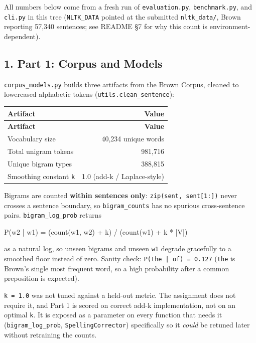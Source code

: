 \documentclass[11pt,a4paper]{article}
\begin{document}
All numbers below come from a fresh run of \texttt{evaluation.\allowbreak{}py}, \texttt{benchmark.\allowbreak{}py}, and \texttt{cli.\allowbreak{}py} in this tree (\texttt{NLTK\_\allowbreak{}DATA} pointed at the submitted \texttt{nltk\_\allowbreak{}data/\allowbreak{}}, Brown reporting 57,340 sentences; see README \S{}7 for why this count is environment-dependent).

\subsection*{1. Part 1: Corpus and Models}

\texttt{corpus\_\allowbreak{}models.\allowbreak{}py} builds three artifacts from the Brown Corpus, cleaned to lowercased alphabetic tokens (\texttt{utils.\allowbreak{}clean\_\allowbreak{}sentence}):

{\small
\setlength{\tabcolsep}{4pt}
\begin{longtable}{lr}
\toprule
\textbf{Artifact} & \textbf{Value} \\
\midrule
\endfirsthead
\toprule
\textbf{Artifact} & \textbf{Value} \\
\midrule
\endhead
Vocabulary size & 40,234 unique words \\
Total unigram tokens & 981,716 \\
Unique bigram types & 388,815 \\
Smoothing constant \texttt{k} & 1.0 (add-k / Laplace-style) \\
\bottomrule
\end{longtable}}

Bigrams are counted \textbf{within sentences only}: \texttt{zip(sent, sent[1:])} never crosses a sentence boundary, so \texttt{bigram\_\allowbreak{}counts} has no spurious cross-sentence pairs. \texttt{bigram\_\allowbreak{}log\_\allowbreak{}prob} returns

\begin{codeblock}
P(w2 | w1) = (count(w1, w2) + k) / (count(w1) + k * |V|)
\end{codeblock}

as a natural log, so unseen bigrams and unseen \texttt{w1} degrade gracefully to a smoothed floor instead of zero. Sanity check: \texttt{P(the | of) = 0.\allowbreak{}127} (\texttt{the} is Brown's single most frequent word, so a high probability after a common preposition is expected).

\texttt{k = 1.\allowbreak{}0} was not tuned against a held-out metric. The assignment does not require it, and Part 1 is scored on correct add-k implementation, not on an optimal \texttt{k}. It is exposed as a parameter on every function that needs it (\texttt{bigram\_\allowbreak{}log\_\allowbreak{}prob}, \texttt{SpellingCorrector}) specifically so it \textit{could} be retuned later without retraining the counts.
\end{document}
